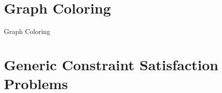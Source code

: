 \documentclass{beamer}
\begin{document}
{\frame[plain]{\titlepage}}

    \showoutlineatsection

    \section{Graph Coloring}

    \begin{frame}{Graph Coloring}

    \end{frame}

    \section{Generic Constraint Satisfaction Problems}

    \section{}
\end{document}
